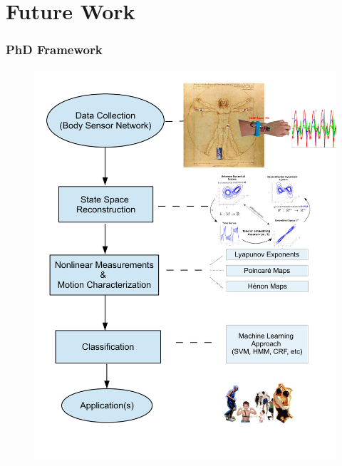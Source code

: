 \documentclass{beamer}
\begin{document}




\section{Future Work}

\begin{frame}
\frametitle{PhD Framework}
\vspace{-0.7cm}

\begin{figure}
\centering 
\includegraphics[scale=0.26]{proposedapproach_v1} \\
\end{figure}

\end{frame}
\end{document}
